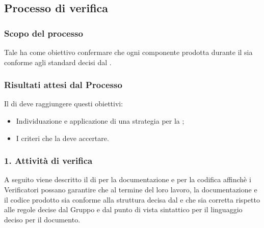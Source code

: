 \subsection{Processo di verifica}
\subsubsection{Scopo del processo}
Tale  ha come obiettivo confermare che ogni componente prodotta durante il  sia conforme agli standard decisi dal .
\subsubsection{Risultati attesi dal Processo}
Il  di  deve raggiungere questi obiettivi:
\begin{itemize}
\item Individuazione e applicazione di una strategia per la ;
\item I criteri che la  deve accertare.
\end{itemize}

\subsubsection{1. Attivit\`a di verifica}
A seguito viene descritto il  di  per la documentazione e per la codifica affinchè i Verificatori possano garantire che al termine del loro lavoro, la documentazione e il codice prodotto sia conforme alla struttura decisa dal  e che sia corretta rispetto alle regole decise dal Gruppo e dal punto di vista sintattico per il linguaggio deciso per il documento.

